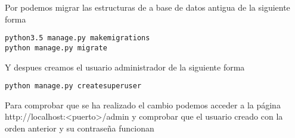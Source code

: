 Por podemos migrar las estructuras de a base de datos antigua de la siguiente forma

\lstset{
  language=Bash,
}
\begin{lstlisting}
python3.5 manage.py makemigrations
python manage.py migrate

\end{lstlisting}

Y despues creamos el usuario administrador de la siguiente forma

\begin{lstlisting}
python manage.py createsuperuser
\end{lstlisting}

Para comprobar que se ha realizado el cambio podemos acceder a la página http://localhost:<puerto>/admin y comprobar que el usuario creado con la orden anterior
y su contraseña funcionan
